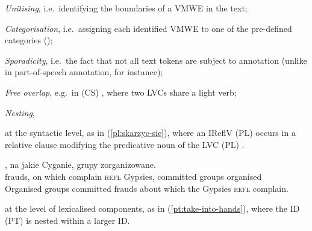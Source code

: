 \documentclass[output=paper,modfonts]{langscibook}
\begin{document}
\begin{sitem}
\item \emph{Unitising}, i.e.\ identifying the boundaries of a VMWE in the text;
\item \emph{Categorisation}, i.e.\ assigning each identified VMWE to one of the pre-de\-fined categories ();%
\item \emph{Sporadicity}, i.e.\ the fact that not all text tokens are subject to annotation (unlike in part-of-speech annotation, for instance);
\item \emph{Free overlap}, e.g.\ in (CS) , where two LVCs share a light verb;

\item \emph{Nesting}, 
    \begin{sitem}
    \item at the syntactic level, as in (\ref{pl:skarzyc-sie}), where an IReflV (PL)  occurs in a relative clause modifying the predicative noun of the LVC (PL) .

\ea \label{pl:skarzyc-sie}
\settowidth {}
\gll {}, na jakie   Cyganie,  grupy zorganizowane. \\
frauds, on which complain \textsc{refl} Gypsies, committed groups organised\\ 
\glt Organised groups committed frauds about which the Gypsies \textsc{refl} complain. 
\z

	\item at the level of lexicalised components, as in (\ref{pt:take-into-hands}), where the ID (PT)  is nested within a larger ID.
    


\end{sitem}
\end{sitem}
\end{document}
